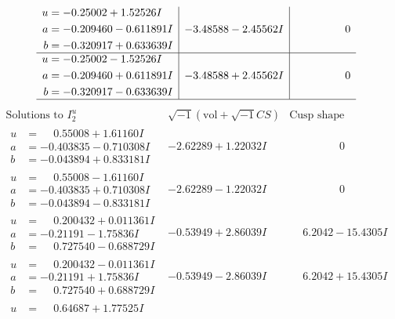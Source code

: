 \documentclass[1p]{elsarticle_modified}
\theoremstyle{definition}
\newcommand{\I}{\sqrt{-1}}
\begin{document}
$$\begin{array}{c|c|c}
\begin{aligned}
u &= -0.25002 + 1.52526 I \\
a &= -0.209460 - 0.611891 I \\
b &= -0.320917 + 0.633639 I\end{aligned}
 & -3.48588 - 2.45562 I & \phantom{-0.000000 } 0 \\ \hline\begin{aligned}
u &= -0.25002 - 1.52526 I \\
a &= -0.209460 + 0.611891 I \\
b &= -0.320917 - 0.633639 I\end{aligned}
 & -3.48588 + 2.45562 I & \phantom{-0.000000 } 0\\
 \hline 
 \end{array}$$\newpage$$\begin{array}{c|c|c}  
\text{Solutions to }I^u_{2}& \I (\text{vol} + \sqrt{-1}CS) & \text{Cusp shape}\\
 \hline 
\begin{aligned}
u &= \phantom{-}0.55008 + 1.61160 I \\
a &= -0.403835 - 0.710308 I \\
b &= -0.043894 + 0.833181 I\end{aligned}
 & -2.62289 + 1.22032 I & \phantom{-0.000000 } 0 \\ \hline\begin{aligned}
u &= \phantom{-}0.55008 - 1.61160 I \\
a &= -0.403835 + 0.710308 I \\
b &= -0.043894 - 0.833181 I\end{aligned}
 & -2.62289 - 1.22032 I & \phantom{-0.000000 } 0 \\ \hline\begin{aligned}
u &= \phantom{-}0.200432 + 0.011361 I \\
a &= -0.21191 - 1.75836 I \\
b &= \phantom{-}0.727540 - 0.688729 I\end{aligned}
 & -0.53949 + 2.86039 I & \phantom{-}6.2042 - 15.4305 I \\ \hline\begin{aligned}
u &= \phantom{-}0.200432 - 0.011361 I \\
a &= -0.21191 + 1.75836 I \\
b &= \phantom{-}0.727540 + 0.688729 I\end{aligned}
 & -0.53949 - 2.86039 I & \phantom{-}6.2042 + 15.4305 I \\ \hline\begin{aligned}
u &= \phantom{-}0.64687 + 1.77525 I \\

\end{aligned}
\end{array}$$
\end{document}
